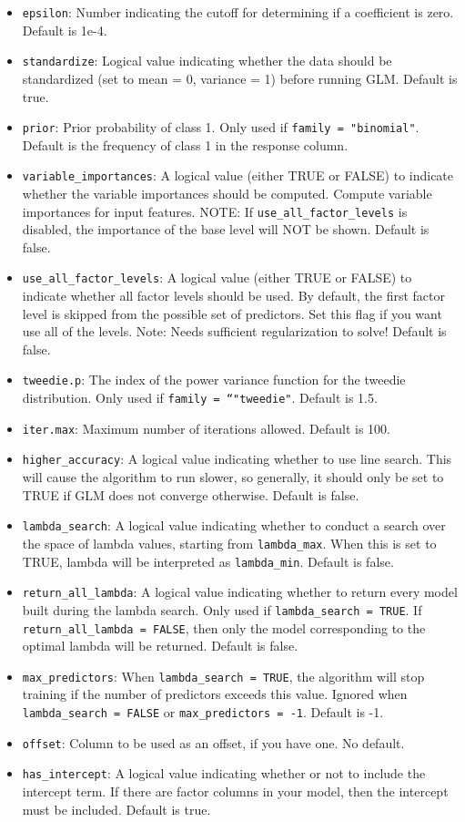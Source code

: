 \documentclass[11pt]{article}
\begin{document}
\begin{itemize}
\item \texttt{epsilon}: Number indicating the cutoff for determining if a coefficient is zero. Default is 1e-4.
\item \texttt{standardize}: Logical value indicating whether the data should be standardized (set to mean = 0, variance = 1) before running GLM. Default is true.
\item \texttt{prior}: Prior probability of class 1. Only used if \texttt{family = "binomial"}. Default is the frequency of class 1 in the response column. 
\item \texttt{variable\_importances}: A logical value (either TRUE or FALSE) to indicate whether the variable importances should be computed.  Compute variable importances for input features. NOTE: If \texttt{use\_all\_factor\_levels} is disabled,  the importance of the base level will NOT be shown. Default is false.
\item \texttt{use\_all\_factor\_levels}: A logical value (either TRUE or FALSE) to indicate whether all factor levels should be used. By default, the first factor level is skipped from the possible set of predictors. Set this flag if you want use all of the levels. Note: Needs sufficient regularization to solve! Default is false.
\item \texttt{tweedie.p}: The index of the power variance function for the tweedie distribution. Only used if \texttt{family = “"tweedie"}. Default is 1.5.
\item \texttt{iter.max}: Maximum number of iterations allowed. Default is 100.
\item \texttt{higher\_accuracy}: A logical value indicating whether to use line search. This will cause the algorithm to run slower, so generally, it should only be set to TRUE if GLM does not converge otherwise. Default is false.
\item \texttt{lambda\_search}: A logical value indicating whether to conduct a search over the space of lambda values, starting from \texttt{lambda\_max}. When this is set to TRUE, lambda will be interpreted as \texttt{lambda\_min}. Default is false.
\item \texttt{return\_all\_lambda}: A logical value indicating whether to return every model built during the lambda search. Only used if \texttt{lambda\_search = TRUE}. If \texttt{return\_all\_lambda = FALSE}, then only the model corresponding to the optimal lambda will be returned. Default is false.
\item \texttt{max\_predictors}: When \texttt{lambda\_search = TRUE}, the algorithm will stop training if the number of predictors exceeds this value. Ignored when \texttt{ lambda\_search = FALSE} or \texttt{max\_predictors = -1}. Default is -1.
\item \texttt{offset}: Column to be used as an offset, if you have one. No default.
\item \texttt{has\_intercept}: A logical value indicating whether or not to include the intercept term. If there are factor columns in your model, then the intercept must be included. Default is true.


\end{itemize}
\end{document}
